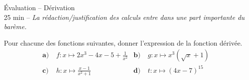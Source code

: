 \documentclass[11pt]{article}
\begin{document}
\begin{center}
  {\Huge Évaluation -- Dérivation}\\
  25 min -- \emph{La rédaction/justification des calculs entre dans une part
  importante du barème.}
\end{center}

\noindent Pour chacune des fonctions suivantes, donner l'expression de la fonction
dérivée.
\begin{align*}
  \textbf{a)}\; & f:x\mapsto 2x^3-4x-5+\frac{1}{x^2} &
  \textbf{b)}\; & g:x\mapsto x^3(\sqrt x+1) \\
  \textbf{c)}\; & h:x\mapsto \frac{x-1}{x^2+1} &
  \textbf{d)}\; & t:x\mapsto (4x-7)^{15}
\end{align*}
\end{document}
